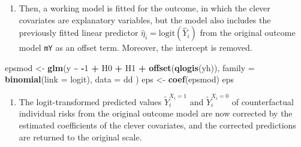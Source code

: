 \documentclass[
]{book}
\newenvironment{Shaded}{\begin{snugshade}}{\end{snugshade}}
\newcommand{\AttributeTok}[1]{\textcolor[rgb]{0.13,0.29,0.53}{#1}}
\newcommand{\DecValTok}[1]{\textcolor[rgb]{0.00,0.00,0.81}{#1}}
\newcommand{\FunctionTok}[1]{\textcolor[rgb]{0.13,0.29,0.53}{\textbf{#1}}}
\newcommand{\NormalTok}[1]{#1}
\newcommand{\OtherTok}[1]{\textcolor[rgb]{0.56,0.35,0.01}{#1}}
\newcommand{\SpecialCharTok}[1]{\textcolor[rgb]{0.81,0.36,0.00}{\textbf{#1}}}
\providecommand{\tightlist}{%
  \setlength{\itemsep}{0pt}\setlength{\parskip}{0pt}}
\begin{document}
\begin{Shaded}
\end{Shaded}

\begin{enumerate}
\def\labelenumi{\arabic{enumi}.}
\setcounter{enumi}{1}
\tightlist
\item
  Then, a working model is fitted for the outcome,
  in which the clever covariates
  are explanatory variables, but the model also includes
  the previously fitted linear predictor
  \(\widehat{\eta}_i = \text{logit}(\widehat Y_i)\)
  from the original outcome model \texttt{mY}
  as an offset term. Moreover, the intercept is removed.
\end{enumerate}

\begin{Shaded}
\begin{Highlighting}[]
\NormalTok{epsmod }\OtherTok{\textless{}{-}} \FunctionTok{glm}\NormalTok{(y }\SpecialCharTok{\textasciitilde{}} \SpecialCharTok{{-}}\DecValTok{1} \SpecialCharTok{+}\NormalTok{ H0 }\SpecialCharTok{+}\NormalTok{ H1 }\SpecialCharTok{+} \FunctionTok{offset}\NormalTok{(}\FunctionTok{qlogis}\NormalTok{(yh)),}
  \AttributeTok{family =} \FunctionTok{binomial}\NormalTok{(}\AttributeTok{link =}\NormalTok{ logit), }\AttributeTok{data =}\NormalTok{ dd}
\NormalTok{)}
\NormalTok{eps }\OtherTok{\textless{}{-}} \FunctionTok{coef}\NormalTok{(epsmod)}
\NormalTok{eps}
\end{Highlighting}
\end{Shaded}

\begin{enumerate}
\def\labelenumi{\arabic{enumi}.}
\setcounter{enumi}{2}
\tightlist
\item
  The logit-transformed predicted values \(\widetilde{Y}_i^{X_i=1}\) and
  \(\widetilde{Y}_i^{X_i=0}\)
  of counterfactual individual risks from the original outcome model are
  now corrected by the estimated coefficients of the clever covariates,
  and the corrected predictions are returned to the original scale.
\end{enumerate}
\end{document}
